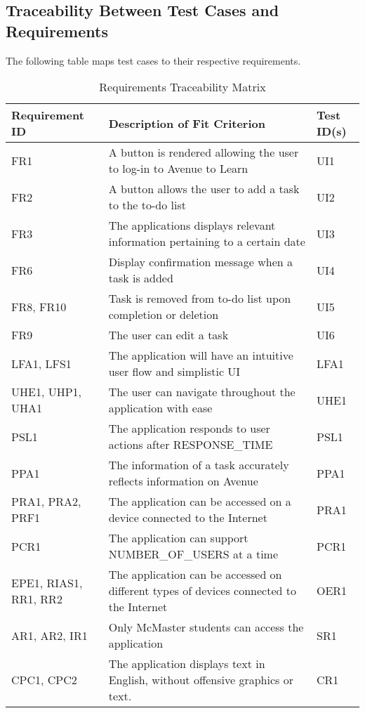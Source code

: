 \documentclass[12pt, titlepage]{article}
\begin{document}
\subsection{Traceability Between Test Cases and Requirements}

The following table maps test cases to their respective requirements.

\begin{table}[H]
\caption{Requirements Traceability Matrix}
\begin{center}
\begin{tabular}{ |m{7em}|m{20em}|m{6em}|} 
 \hline
 Requirement ID & Description of Fit Criterion & Test ID(s) \\ 
 \hline
 FR1 & A button is rendered allowing the user to log-in to Avenue to Learn & UI1 \\
 \hline
 FR2 & A button allows the user to add a task to the to-do list & UI2\\ 
 \hline
 FR3 & The applications displays relevant information pertaining to a certain date & UI3\\
 \hline 
 FR6 & Display confirmation message when a task is added & UI4\\
 \hline
 FR8, FR10 & Task is removed from to-do list upon completion or deletion & UI5\\
 \hline
 FR9 & The user can edit a task & UI6\\
 \hline
 LFA1, LFS1 & The application will have an intuitive user flow and simplistic UI & LFA1\\
 \hline
 UHE1, UHP1, UHA1 & The user can navigate throughout the application with ease & UHE1\\
 \hline 
 PSL1 & The application responds to user actions after RESPONSE\_TIME & PSL1\\
 \hline
 PPA1 & The information of a task accurately reflects information on Avenue & PPA1\\
 \hline
 PRA1, PRA2, PRF1 & The application can be accessed on a device connected to the Internet & PRA1\\
 \hline
 PCR1 & The application can support NUMBER\_OF\_USERS at a time & PCR1\\
 \hline
 EPE1, RIAS1, RR1, RR2 & The application can be accessed on different types of devices connected to the Internet & OER1\\
 \hline
 AR1, AR2, IR1 & Only McMaster students can access the application & SR1\\
 \hline
 CPC1, CPC2 & The application displays text in English, without offensive graphics or text. & CR1\\
 \hline
\end{tabular}
\end{center}
\label{traceability}
\end{table}
\end{document}
